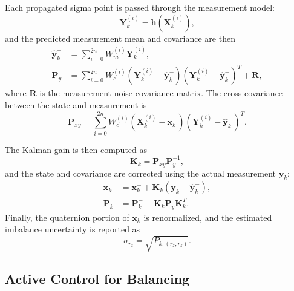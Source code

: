 Each propagated sigma point is passed through the measurement model:
\begin{equation}
    \bm{Y}_k^{(i)} = \bm{h}(\bm{X}_k^{(i)}),
\end{equation}
and the predicted measurement mean and covariance are then
\begin{align}
    \hat{\bm{y}}_k^- &= \sum_{i=0}^{2n} W_m^{(i)} \bm{Y}_k^{(i)},\\
    \bm{P}_y &= \sum_{i=0}^{2n} W_c^{(i)}(\bm{Y}_k^{(i)} - \hat{\bm{y}}_k^-)(\bm{Y}_k^{(i)} - \hat{\bm{y}}_k^-)^T + \bm{R},
\end{align}
where $\bm{R}$ is the measurement noise covariance matrix. The cross-covariance between the state and measurement is
\begin{equation}
    \bm{P}_{xy} = \sum_{i=0}^{2n} W_c^{(i)}(\bm{X}_k^{(i)} - \bm{x}_k^-)(\bm{Y}_k^{(i)} - \hat{\bm{y}}_k^-)^T.
\end{equation}

The Kalman gain is then computed as
\begin{equation}
    \bm{K}_k = \bm{P}_{xy}\bm{P}_y^{-1},
\end{equation}
and the state and covariance are corrected using the actual measurement $\bm{y}_k$:
\begin{align}
    \bm{x}_k &= \bm{x}_k^- + \bm{K}_k(\bm{y}_k - \hat{\bm{y}}_k^-),\\
    \bm{P}_k &= \bm{P}_k^- - \bm{K}_k\bm{P}_y\bm{K}_k^T.
\end{align}
Finally, the quaternion portion of $\bm{x}_k$ is renormalized, and the estimated imbalance uncertainty is reported as
\begin{equation}
    \sigma_{r_z} = \sqrt{P_{k,(r_z,r_z)}}.
\end{equation}

\subsection{Active Control for Balancing}

